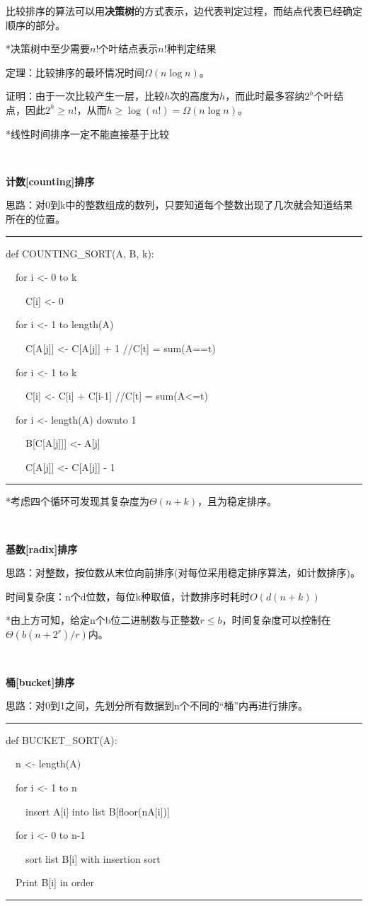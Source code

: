 \documentclass[a4paper,UTF8,fontset=windows]{ctexart}
\newenvironment{code}{\rule{36em}{0.1em}\setlength{\parindent}{1em}

}{

\setlength{\parindent}{0em}\rule{36em}{0.1em}}
\begin{document}
比较排序的算法可以用\textbf{决策树}的方式表示，边代表判定过程，而结点代表已经确定顺序的部分。

*\hspace{0em}决策树中至少需要$n!$个叶结点表示$n!$种判定结果

定理：比较排序的最坏情况时间$\Omega(n\log n)$。

证明：由于一次比较产生一层，比较$h$次的高度为$h$，而此时最多容纳$2^h$个叶结点，因此$2^h\ge n!$，从而$h\ge\log(n!)=\Omega(n\log n)$。

*\hspace{0em}线性时间排序一定不能直接基于比较

\

\textbf{计数[counting]排序}

思路：对0到k中的整数组成的数列，只要知道每个整数出现了几次就会知道结果所在的位置。

\begin{code}
def COUNTING\_SORT(A, B, k):

\ \ for i <- 0 to k

\ \ \ \ C[i] <- 0

\ \ for i <- 1 to length(A)

\ \ \ \ C[A[j]] <- C[A[j]] + 1   //C[t] = sum(A==t)

\ \ for i <- 1 to k

\ \ \ \ C[i] <- C[i] + C[i-1]   //C[t] = sum(A<=t)

\ \ for i <- length(A) downto 1

\ \ \ \ B[C[A[j]]] <- A[j]

\ \ \ \ C[A[j]] <- C[A[j]] - 1
\end{code}

*\hspace{0em}考虑四个循环可发现其复杂度为$\Theta(n+k)$，且为稳定排序。

\

\textbf{基数[radix]排序}

思路：对整数，按位数从末位向前排序(对每位采用稳定排序算法，如计数排序)。

时间复杂度：n个d位数，每位k种取值，计数排序时耗时$O(d(n+k))$

*\hspace{0em}由上方可知，给定n个b位二进制数与正整数$r\le b$，时间复杂度可以控制在$\Theta(b(n+2^r)/r)$内。

\

\textbf{桶[bucket]排序}

思路：对0到1之间，先划分所有数据到n个不同的“桶”内再进行排序。

\begin{code}
def BUCKET\_SORT(A):

\ \ n <- length(A)

\ \ for i <- 1 to n

\ \ \ \ insert A[i] into list B[floor(nA[i])]

\ \ for i <- 0 to n-1

\ \ \ \ sort list B[i] with insertion sort

\ \ Print B[i] in order
\end{code}
\end{document}
